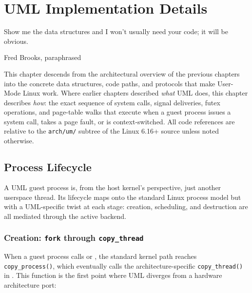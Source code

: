 \chapter{UML Implementation Details}
\label{ch:implementation}

\epigraph{%
  Show me the data structures and I won't usually need your code;
  it will be obvious.%
}{Fred Brooks, paraphrased}

This chapter descends from the architectural overview of the previous chapters
into the concrete data structures, code paths, and protocols that make
User-Mode Linux work.  Where earlier chapters described \emph{what} UML does,
this chapter describes \emph{how}: the exact sequence of system calls, signal
deliveries, futex operations, and page-table walks that execute when a guest
process issues a system call, takes a page fault, or is context-switched.
All code references are relative to the \texttt{arch/um/} subtree of the Linux
6.16+ source unless noted otherwise.

\section{Process Lifecycle}
\label{sec:impl-process-lifecycle}

A UML guest process is, from the host kernel's perspective, just another
userspace thread.  Its lifecycle maps onto the standard Linux process model
but with a UML-specific twist at each stage: creation, scheduling, and
destruction are all mediated through the active backend.

\subsection{Creation: \texttt{fork} through \texttt{copy\_thread}}
\label{sec:impl-process-creation}

When a guest process calls  or , the standard
kernel path reaches \texttt{copy\_process()}, which eventually calls the
architecture-specific \texttt{copy\_thread()} in
.  This function is the first point where
UML diverges from a hardware architecture port:

